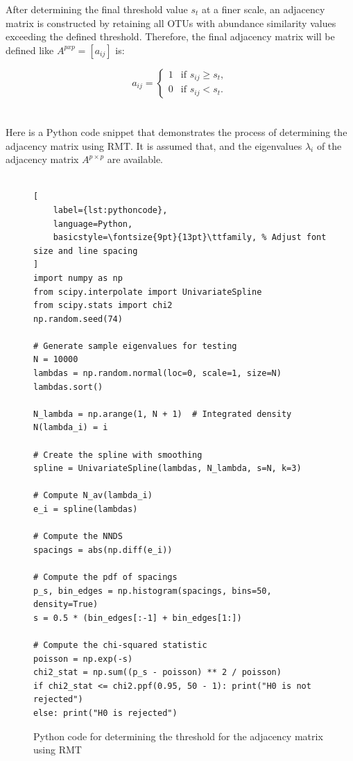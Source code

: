 \noindent After determining the final threshold value $s_t$ at a finer scale, an adjacency matrix is constructed by retaining all OTUs with abundance similarity values exceeding the defined threshold.
Therefore, the final adjacency matrix will be defined like $A^{pxp}=[a_{ij}]$ is:

\[a_{ij} =
\begin{cases}
1 & \text{if } s_{ij} \geq s_t, \\
0 & \text{if } s_{ij} < s_t.
\end{cases}\]
\\\\
\noindent Here is a Python code snippet that demonstrates the process of determining the adjacency matrix using RMT.
It is assumed that, and the eigenvalues $\lambda_i$ of the adjacency matrix $A^{p \times p}$ are available.
\\\\
\begin{figure}[H] %
\centering
\begin{lstlisting}[
    label={lst:pythoncode},
    language=Python,
    basicstyle=\fontsize{9pt}{13pt}\ttfamily, % Adjust font size and line spacing
]
import numpy as np
from scipy.interpolate import UnivariateSpline
from scipy.stats import chi2
np.random.seed(74)

# Generate sample eigenvalues for testing
N = 10000
lambdas = np.random.normal(loc=0, scale=1, size=N)
lambdas.sort()

N_lambda = np.arange(1, N + 1)  # Integrated density N(lambda_i) = i

# Create the spline with smoothing
spline = UnivariateSpline(lambdas, N_lambda, s=N, k=3)

# Compute N_av(lambda_i)
e_i = spline(lambdas)

# Compute the NNDS
spacings = abs(np.diff(e_i))

# Compute the pdf of spacings
p_s, bin_edges = np.histogram(spacings, bins=50, density=True)
s = 0.5 * (bin_edges[:-1] + bin_edges[1:])

# Compute the chi-squared statistic
poisson = np.exp(-s)
chi2_stat = np.sum((p_s - poisson) ** 2 / poisson)
if chi2_stat <= chi2.ppf(0.95, 50 - 1): print("H0 is not rejected")
else: print("H0 is rejected")
\end{lstlisting}
\caption{Python code for determining the threshold for the adjacency matrix using RMT}
\label{fig:pythoncode}
\end{figure}

